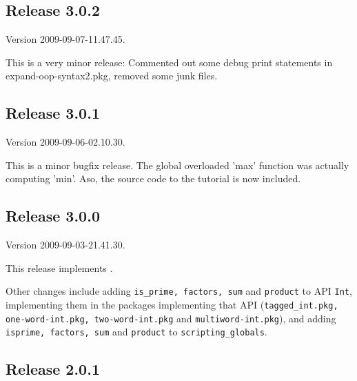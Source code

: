 \cutend*


\subsection{Release 3.0.2}
\label{section:src:release-3.0.2}

Version 2009-09-07-11.47.45.

This is a very minor release: Commented out some debug print statements 
in expand-oop-syntax2.pkg, removed some junk files.

\cutend*


\subsection{Release 3.0.1}
\label{section:src:release-3.0.1}

Version 2009-09-06-02.10.30.

This is a minor bugfix release.  The global overloaded 'max' function 
was actually computing 'min'.  Aso, the source code to the 
tutorial is now included.

\cutend*


\subsection{Release 3.0.0}
\label{section:src:release-3.0.0}

Version 2009-09-03-21.41.30.

This release implements 
. 

Other changes include adding {\tt is\_prime, factors, sum} and {\tt product} 
to {\sc API} {\tt Int}, implementing them in the packages implementing 
that API ({\tt tagged\_int.pkg, one-word-int.pkg, two-word-int.pkg} and {\tt multiword-int.pkg}), 
and adding {\tt isprime, factors, sum} and {\tt product} to {\tt scripting\_globals}.

\cutend*

\subsection{Release 2.0.1}
\label{section:src:release-2.0.1}

